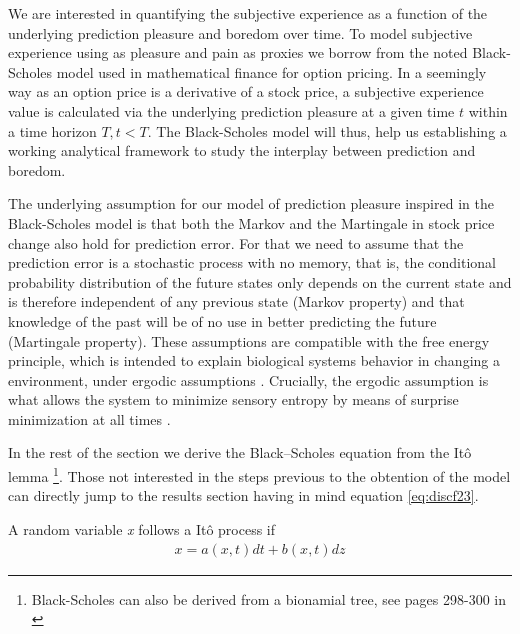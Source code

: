 \documentclass[11pt, onecolumn]{article}
\begin{document}
We are interested in quantifying the subjective experience as a function of the underlying prediction pleasure and boredom over time. To model subjective experience using as pleasure and pain as proxies we borrow from the noted Black-Scholes model \citep{black_pricing_1973} used in mathematical finance for option pricing. In a seemingly way as an option price is a derivative of a stock price, a subjective experience value is calculated via the underlying prediction pleasure at a given time $t$ within a time horizon $T, t < T$. The Black-Scholes model will thus, help us  establishing a working analytical framework to study the interplay between prediction and boredom.
 
The underlying assumption for our model of prediction pleasure inspired in the Black-Scholes model is that both the Markov and the Martingale in stock price change also hold for prediction error. For that we need to assume that the prediction error is a stochastic process with no memory, that is, the conditional probability distribution of the future states only depends on the current state and is therefore independent of any previous state (Markov property) and that knowledge of the past will be of no use in better predicting the future (Martingale property). These assumptions are compatible with the free energy principle, which is intended to explain biological systems behavior in changing a environment, under ergodic assumptions \citep{birkhoff_proof_1931}. Crucially, the ergodic assumption is what allows the system to minimize sensory entropy by means of surprise minimization at all times \citep{friston_action_2010}. 

In the rest of the section we derive the Black–Scholes equation from the It\^{o} lemma \citep{ito_stochastic_1951} \footnote{Black-Scholes can  also be derived from a bionamial tree, see pages 298-300 in \citep{hull_options_2011}}. Those not interested in the steps previous to the obtention of the model can directly jump to  the results section having in mind equation \ref{eq:discf23}.

A random variable \emph{x} follows a It\^{o} process if 
\begin{equation*}
\begin{split}
   x = a(x,t)dt + b(x,t)dz
\end{split}
\label{eq:itopr}
\end{equation*}
\end{document}
